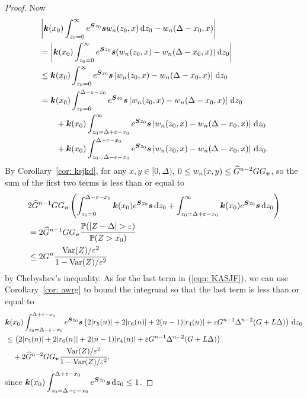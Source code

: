 \begin{proof}
	Now
	\begin{align}
		\nonumber&\left|\boldsymbol k(x_0) \int_{z_0=0}^\infty e^{\boldsymbol Sz_0}\boldsymbol sw_n(z_0,x)\, \mathrm{d} z_0 - w_n(\Delta - x_0,x) \right|
		\\\nonumber&= \left|\boldsymbol k(x_0) \int_{z_0=0}^\infty e^{\boldsymbol Sz_0}\boldsymbol s(w_n(z_0,x) - w_n(\Delta - x_0,x)) \, \mathrm{d} z_0\right|
		\\\nonumber&\leq \boldsymbol k(x_0) \int_{z_0=0}^\infty e^{\boldsymbol Sz_0}\boldsymbol s  \left|w_n(z_0,x) - w_n(\Delta - x_0,x)\right| \, \mathrm{d} z_0
		\\\nonumber&= \boldsymbol k(x_0) \int_{z_0=0}^{\Delta-\varepsilon-x_0} e^{\boldsymbol Sz_0}\boldsymbol s  \left|w_n(z_0,x) - w_n(\Delta - x_0,x)\right| \, \mathrm{d} z_0
		\\\nonumber&\qquad{}+\boldsymbol k(x_0) \int_{z_0=\Delta+\varepsilon-x_0}^\infty e^{\boldsymbol Sz_0}\boldsymbol s  \left|w_n(z_0,x) - w_n(\Delta - x_0,x)\right| \, \mathrm{d} z_0
		\\\label{eqn: KASJF}&\qquad{}+\boldsymbol k(x_0) \int_{z_0=\Delta-\varepsilon-x_0}^{\Delta+\varepsilon-x_0} e^{\boldsymbol Sz_0}\boldsymbol s  \left|w_n(z_0,x) - w_n(\Delta - x_0,x)\right| \, \mathrm{d} z_0.
		\end{align}
		By Corollary~\ref{cor: ksjkd}, for any \(x,y\in [0,\Delta)\), \(0\leq w_n(x,y)\leq \widehat G^{n-2}GG_{\boldsymbol v}\), so the sum of the first two terms is less than or equal to 
		\begin{align}
		&2\widehat G^{n-1}GG_{\bs v}\left(\int_{z_0=0}^{\Delta-\varepsilon-x_0}\bs k(x_0)e^{\bs S z_0} \bs s \wrt z_0+\int_{z_0=\Delta+\varepsilon-x_0}^\infty \bs k(x_0)e^{\bs S z_0} \bs s \wrt z_0\right)
		\\\nonumber &= 2\widehat G^{n-1}GG_{\bs v} \cfrac{\mathbb P(|Z-\Delta|> \varepsilon)}{\mathbb P(Z> x_0)}
		\\&\leq 2G^n\cfrac{\var(Z)/\varepsilon^2}{1-\var(Z)/\varepsilon^2}
		\end{align}
		by Chebyshev's inequality. As for the last term in (\ref{eqn: KASJF}), we can use Corollary~\ref{cor: awrg} to bound the integrand so that the last term is less than or equal to 
		\begin{align}
		\nonumber&\boldsymbol k(x_0) \int_{z_0=\Delta-\varepsilon-x_0}^{\Delta+\varepsilon-x_0} e^{\boldsymbol Sz_0}\boldsymbol s \left( 2|r_5(n)| + 2|r_6(n)| + 2(n-1)|r_4(n)| + \varepsilon G^{n-1}\Delta^{n-2}(G+L\Delta) \right) \, \mathrm{d} z_0
		\\\nonumber&\leq  \left( 2|r_5(n)| + 2|r_6(n)| + 2(n-1)|r_4(n)| + \varepsilon G^{n-1}\Delta^{n-2}(G+L\Delta) \right)
		\\&\quad{}+2\widehat G^{n-2}GG_{\boldsymbol v}\cfrac{\mathrm{Var}(Z)/\varepsilon^2}{1-\mathrm{Var}(Z)/\varepsilon^2} ,
	\end{align}
	since \(\displaystyle \boldsymbol k(x_0) \int_{z_0=\Delta-\varepsilon-x_0}^{\Delta+\varepsilon-x_0} e^{\boldsymbol Sz_0}\boldsymbol s\, \mathrm{d} z_0\leq 1\). 
\end{proof}

